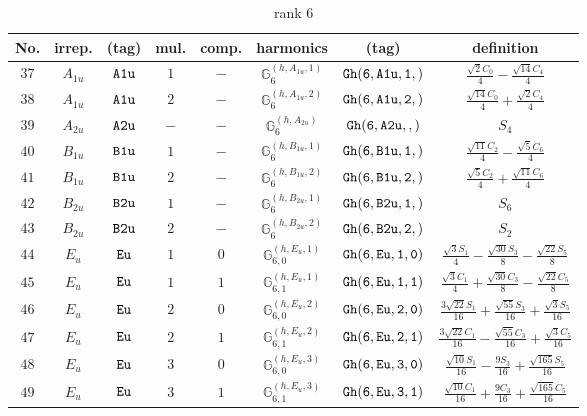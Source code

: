 \documentclass[fleqn,8pt]{jsarticle}
\begin{document}
\begin{table}[ht!]
\begin{center}
\caption{rank 6}
\renewcommand{\arraystretch}{1.3}
\begin{tabular}{cccccccc} \hline \hline
No. & irrep. & (tag) & mul. & comp. & harmonics & (tag) & definition \\ \hline
$ 37 $ & $ A_{1u} $ & $ {\tt A1u} $ & $ 1 $ & $ - $ & $ \mathbb{G}_{6}^{(h,A_{1u},1)} $ & $ {\tt Gh(6,A1u,1,)} $ & $ \frac{\sqrt{2} C_{0}}{4} - \frac{\sqrt{14} C_{4}}{4} $ \\
$ 38 $ & $ A_{1u} $ & $ {\tt A1u} $ & $ 2 $ & $ - $ & $ \mathbb{G}_{6}^{(h,A_{1u},2)} $ & $ {\tt Gh(6,A1u,2,)} $ & $ \frac{\sqrt{14} C_{0}}{4} + \frac{\sqrt{2} C_{4}}{4} $ \\
$ 39 $ & $ A_{2u} $ & $ {\tt A2u} $ & $ - $ & $ - $ & $ \mathbb{G}_{6}^{(h,A_{2u})} $ & $ {\tt Gh(6,A2u,,)} $ & $ S_{4} $ \\
$ 40 $ & $ B_{1u} $ & $ {\tt B1u} $ & $ 1 $ & $ - $ & $ \mathbb{G}_{6}^{(h,B_{1u},1)} $ & $ {\tt Gh(6,B1u,1,)} $ & $ \frac{\sqrt{11} C_{2}}{4} - \frac{\sqrt{5} C_{6}}{4} $ \\
$ 41 $ & $ B_{1u} $ & $ {\tt B1u} $ & $ 2 $ & $ - $ & $ \mathbb{G}_{6}^{(h,B_{1u},2)} $ & $ {\tt Gh(6,B1u,2,)} $ & $ \frac{\sqrt{5} C_{2}}{4} + \frac{\sqrt{11} C_{6}}{4} $ \\
$ 42 $ & $ B_{2u} $ & $ {\tt B2u} $ & $ 1 $ & $ - $ & $ \mathbb{G}_{6}^{(h,B_{2u},1)} $ & $ {\tt Gh(6,B2u,1,)} $ & $ S_{6} $ \\
$ 43 $ & $ B_{2u} $ & $ {\tt B2u} $ & $ 2 $ & $ - $ & $ \mathbb{G}_{6}^{(h,B_{2u},2)} $ & $ {\tt Gh(6,B2u,2,)} $ & $ S_{2} $ \\
$ 44 $ & $ E_{u} $ & $ {\tt Eu} $ & $ 1 $ & $ 0 $ & $ \mathbb{G}_{6,0}^{(h,E_{u},1)} $ & $ {\tt Gh(6,Eu,1,0)} $ & $ \frac{\sqrt{3} S_{1}}{4} - \frac{\sqrt{30} S_{3}}{8} - \frac{\sqrt{22} S_{5}}{8} $ \\
$ 45 $ & $ E_{u} $ & $ {\tt Eu} $ & $ 1 $ & $ 1 $ & $ \mathbb{G}_{6,1}^{(h,E_{u},1)} $ & $ {\tt Gh(6,Eu,1,1)} $ & $ \frac{\sqrt{3} C_{1}}{4} + \frac{\sqrt{30} C_{3}}{8} - \frac{\sqrt{22} C_{5}}{8} $ \\
$ 46 $ & $ E_{u} $ & $ {\tt Eu} $ & $ 2 $ & $ 0 $ & $ \mathbb{G}_{6,0}^{(h,E_{u},2)} $ & $ {\tt Gh(6,Eu,2,0)} $ & $ \frac{3 \sqrt{22} S_{1}}{16} + \frac{\sqrt{55} S_{3}}{16} + \frac{\sqrt{3} S_{5}}{16} $ \\
$ 47 $ & $ E_{u} $ & $ {\tt Eu} $ & $ 2 $ & $ 1 $ & $ \mathbb{G}_{6,1}^{(h,E_{u},2)} $ & $ {\tt Gh(6,Eu,2,1)} $ & $ \frac{3 \sqrt{22} C_{1}}{16} - \frac{\sqrt{55} C_{3}}{16} + \frac{\sqrt{3} C_{5}}{16} $ \\
$ 48 $ & $ E_{u} $ & $ {\tt Eu} $ & $ 3 $ & $ 0 $ & $ \mathbb{G}_{6,0}^{(h,E_{u},3)} $ & $ {\tt Gh(6,Eu,3,0)} $ & $ \frac{\sqrt{10} S_{1}}{16} - \frac{9 S_{3}}{16} + \frac{\sqrt{165} S_{5}}{16} $ \\
$ 49 $ & $ E_{u} $ & $ {\tt Eu} $ & $ 3 $ & $ 1 $ & $ \mathbb{G}_{6,1}^{(h,E_{u},3)} $ & $ {\tt Gh(6,Eu,3,1)} $ & $ \frac{\sqrt{10} C_{1}}{16} + \frac{9 C_{3}}{16} + \frac{\sqrt{165} C_{5}}{16} $ \\
 \hline \hline
\end{tabular}
\end{center}
\end{table}
\end{document}
